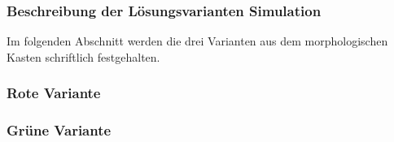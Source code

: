 \documentclass[main.tex]{subfiles} %
\begin{document}

\subsubsection{Beschreibung der Lösungsvarianten Simulation}
Im folgenden Abschnitt werden die drei Varianten aus dem morphologischen Kasten
schriftlich festgehalten.

\subsubsection*{Rote Variante}
\lipsum[4]

\subsubsection*{Grüne Variante}
\lipsum[4]
\end{document}
